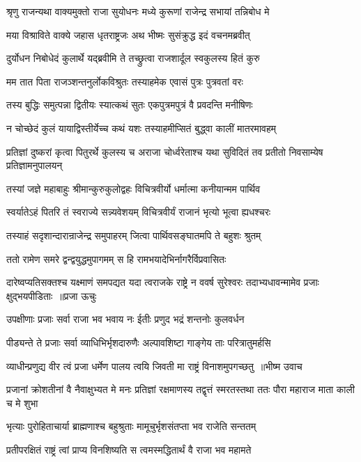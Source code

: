 \twolineshloka
{श्रृणु राजन्यथा वाक्यमुक्तो राजा सुयोधनः}
{मध्ये कुरूणां राजेन्द्र सभायां तन्निबोध मे}


\twolineshloka
{मया विश्राविते वाक्ये जहास धृतराष्ट्रजः}
{अथ भीष्मः सुसंक्रुद्ध इदं वचनमब्रवीत्}


\twolineshloka
{दुर्योधन निबोधेदं कुलार्थे यद्ब्रवीमि ते}
{तच्छ्रुत्वा राजशार्दूल स्वकुलस्य हितं कुरु}


\twolineshloka
{मम तात पिता राजञ्शन्तनुर्लोकविश्रुतः}
{तस्याहमेक एवासं पुत्रः पुत्रवतां वरः}


\twolineshloka
{तस्य बुद्धिः समुत्पन्ना द्वितीयः स्यात्कथं सुतः}
{एकपुत्रमपुत्रं वै प्रवदन्ति मनीषिणः}


\twolineshloka
{न चोच्छेदं कुलं यायाद्विस्तीर्येच्च कथं यशः}
{तस्याहमीप्सितं बुद्ध्वा कालीं मातरमावहम्}


\threelineshloka
{प्रतिज्ञां दुष्करां कृत्वा पितुरर्थे कुलस्य च}
{अराजा चोर्ध्वरेताश्च यथा सुविदितं तव}
{प्रतीतो निवसाम्येष प्रतिज्ञामनुपालयन्}


\twolineshloka
{तस्यां जज्ञे महाबाहुः श्रीमान्कुरुकुलोद्वहः}
{विचित्रवीर्यो धर्मात्मा कनीयान्मम पार्थिव}


\twolineshloka
{स्वर्यातेऽहं पितरि तं स्वराज्ये सन्न्यवेशयम्}
{विचित्रवीर्यं राजानं भृत्यो भूत्वा ह्यधश्चरः}


\twolineshloka
{तस्याहं सदृशान्दारान्राजेन्द्र समुपाहरम्}
{जित्वा पार्थिवसङ्घातमपि ते बहुशः श्रुतम्}


\twolineshloka
{ततो रामेण समरे द्वन्द्वयुद्धमुपागमम्}
{स हि रामभयादेभिर्नागरैर्विप्रवासितः}


\fourlineindentedshloka
{दारेष्वप्यतिसक्तश्च यक्ष्माणं समपद्यत}
{यदा त्वराजके राष्ट्रे न ववर्ष सुरेश्वरः}
{तदाभ्यधावन्मामेव प्रजाः क्षुद्भयपीडिताः ॥प्रजा ऊचुः}
{}


\twolineshloka
{उपक्षीणाः प्रजाः सर्वा राजा भव भवाय नः}
{ईतीः प्रणुद भद्रं शन्तनोः कुलवर्धन}


\twolineshloka
{पीड्यन्ते ते प्रजाः सर्वा व्याधिभिर्भृशदारुणैः}
{अल्पावशिष्टा गाङ्गेय ताः परित्रातुमर्हसि}


\threelineshloka
{व्याधीन्प्रणुद्य वीर त्वं प्रजा धर्मेण पालय}
{त्वयि जिवती मा राष्ट्रं विनाशमुपगच्छतु ॥भीष्म उवाच}
{}


\threelineshloka
{प्रजानां क्रोशतीनां वै नैवाक्षुभ्यत मे मनः}
{प्रतिज्ञां रक्षमाणस्य तद्वृत्तं स्मरतस्तथा}
{ततः पौरा महाराज माता काली च मे शुभा}


\twolineshloka
{भृत्याः पुरोहिताचार्या ब्राह्मणाश्च बहुश्रुताः}
{मामूचुर्भृशसंतप्ता भव राजेति सन्ततम्}


\twolineshloka
{प्रतीपरक्षितं राष्ट्रं त्वां प्राप्य विनशिष्यति}
{स त्वमस्मद्धितार्थं वै राजा भव महामते}


